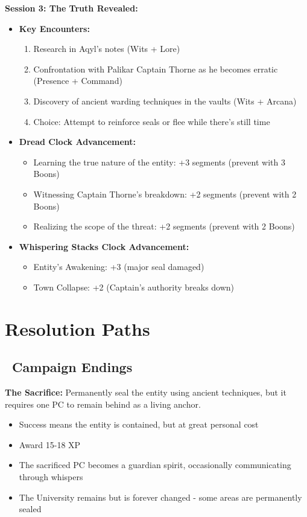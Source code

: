 \documentclass[11pt]{article}
\begin{document}
\textbf{Session 3: The Truth Revealed:}
\begin{itemize}
    \item \textbf{Key Encounters:}
    \begin{enumerate}
        \item Research in Aqyl's notes (Wits + Lore)
        \item Confrontation with Palikar Captain Thorne as he becomes erratic (Presence + Command)
        \item Discovery of ancient warding techniques in the vaults (Wits + Arcana)
        \item Choice: Attempt to reinforce seals or flee while there's still time
    \end{enumerate}
    \item \textbf{Dread Clock Advancement:}
    \begin{itemize}
        \item Learning the true nature of the entity: +3 segments (prevent with 3 Boons)
        \item Witnessing Captain Thorne's breakdown: +2 segments (prevent with 2 Boons)
        \item Realizing the scope of the threat: +2 segments (prevent with 2 Boons)
    \end{itemize}
    \item \textbf{Whispering Stacks Clock Advancement:}
    \begin{itemize}
        \item Entity's Awakening: +3 (major seal damaged)
        \item Town Collapse: +2 (Captain's authority breaks down)
    \end{itemize}
\end{itemize}

\section{Resolution Paths}

\subsection*{\faDoorOpen\ Campaign Endings}

\textbf{The Sacrifice:}
Permanently seal the entity using ancient techniques, but it requires one PC to remain behind as a living anchor.
\begin{itemize}
    \item Success means the entity is contained, but at great personal cost
    \item Award 15-18 XP
    \item The sacrificed PC becomes a guardian spirit, occasionally communicating through whispers
    \item The University remains but is forever changed - some areas are permanently sealed
\end{itemize}
\end{document}
